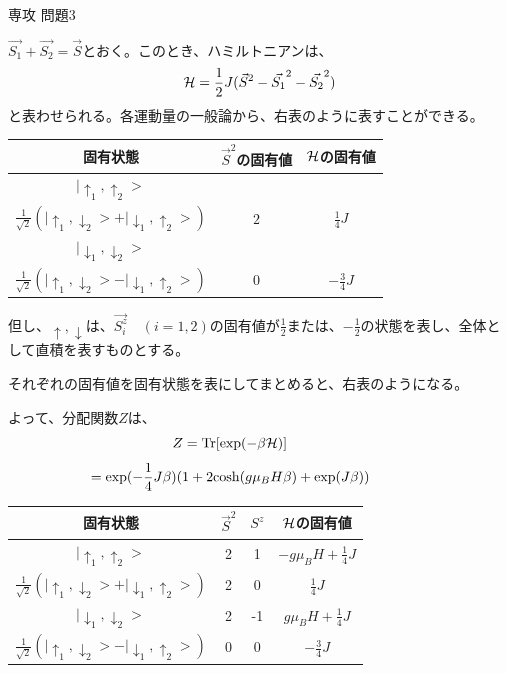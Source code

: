 \documentclass[fleqn]{jbook}
\begin{document}
\begin{answer}{専攻 問題3}{}
\newcommand{\Up}{\uparrow}
\newcommand{\Down}{\downarrow}

\begin{subanswers}
\SubAnswer

\parbox[t]{60mm}{
$\vec{S_1}+\vec{S_2}=\vec{S}$とおく。このとき、ハミルトニアンは、
\[ {\cal{H}}=\frac{1}{2}J (\vec{S}^2-\vec{S_1}^2-\vec{S_2}^2) \]
と表わせられる。各運動量の一般論から、右表のように表すことができる。}
\parbox[t]{100mm}{\vspace*{-5mm}
\quad 
\begin{center}
\begin{tabular}{|c|c|c|} \hline
固有状態        & $\vec{S}^2$の固有値 & $\cal{H}$の固有値  \\ \hline\hline
$| \Up_1,\Up_2 >$     &                   &                  \\
$\frac{1}{\sqrt{2}}(|\Up_1,\Down_2>+|\Down_1,\Up_2>)$  &     $2$             & $\frac{1}{4}J$     \\
$|\Down_1,\Down_2>$  &                   &                  \\ \hline
$\frac{1}{\sqrt{2}}(|\Up_1,\Down_2>-|\Down_1,\Up_2>)$  &     0             & $-\frac{3}{4}J$    \\ \hline
\end{tabular}
\end{center}}

但し、$\Up,\Down$は、$\vec{S_i^z}\quad (i=1,2)$の固有値が$\frac{1}{2}$または、$-\frac{1}{2}$の状態を表し、全体として直積を表すものとする。
\SubAnswer
\parbox[t]{65mm}{
それぞれの固有値を固有状態を表にしてまとめると、右表のようになる。

よって、分配関数$Z$は、
\[\hspace{-15mm} Z = {\rm{Tr}}[\exp(-\beta{\cal{H}})]  \]
\[\hspace{-15mm}   =  {\exp}(-\frac{1}{4}J\beta)(1+2{\cosh}( g \mu_BH\beta)+\exp(J\beta))\]
}
\parbox[t]{95mm}{\vspace*{-5mm}
\begin{center}
\begin{tabular}{|c|c|c|c|} \hline
固有状態 & $\vec{S}^2$ & $S^z$ & $\cal{H}$の固有値 \\ \hline\hline
$|\Up_1,\Up_2>$ &   2   &   1 & $-g\mu_B H+\frac{1}{4} J $ \\ \hline
$\frac{1}{\sqrt{2}}(|\Up_1,\Down_2>+|\Down_1,\Up_2>)$ & 2 & 0 & $\frac{1}{4} J$ \\ \hline
$|\Down_1,\Down_2>$ & 2 & -1 & $g\mu_B H+\frac{1}{4} J $ \\ \hline
$\frac{1}{\sqrt{2}}(|\Up_1,\Down_2>-|\Down_1,\Up_2>)$ & 0 & 0 & $-\frac{3}{4} J$ \\ \hline
\end{tabular}
\end{center}
}


\end{subanswers}
\end{answer}
\end{document}
